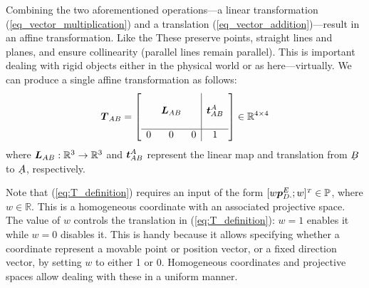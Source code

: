 Combining the two aforementioned operations---a linear transformation (\ref{eq_vector_multiplication}) and a translation (\ref{eq_vector_addition})---result in an affine transformation. Like the These preserve points, straight lines and planes, and ensure collinearity (parallel lines remain parallel). This is important dealing with rigid objects either in the physical world or as here---virtually. We can produce a single affine transformation as follows:
%
\begin{align}\label{eq:T_definition}
\mat{T}_{AB}
= \left[\begin{array}{c c c | c}
& & &   \\
& \mat{L}_{AB}  & & \dvec{t}_{AB}^A \\
& & &  \\\hline
 0 &  0  &  0  &  1
\end{array}\right] \in \mathbb{R}^{4\times4}
\end{align}
where $\boldsymbol{L}_{AB}: \mathbb{R}^3 \to \mathbb{R}^3$ and $\boldsymbol{t}_{AB}^A$ represent the linear map and translation from $\udot{B}$ to $\udot{A}$, respectively.

Note that (\ref{eq:T_definition}) requires an input of the form $[w\boldsymbol{p}_{D\cdot}^E;w]^{\scriptscriptstyle T}\in\mathbb{P}$, where $w\in\mathbb{R}$. This is a homogeneous coordinate with an associated projective space. The value of $w$ controls the translation in (\ref{eq:T_definition}): $w=1$ enables it while $w=0$ disables it. This is handy because it allows specifying whether a coordinate represent a movable point or position vector, or a fixed direction vector, by setting $w$ to either 1 or 0. Homogeneous coordinates and projective spaces allow dealing with these in a uniform manner.


